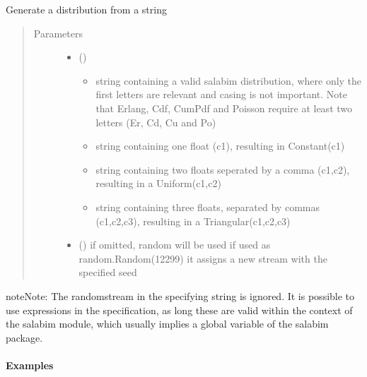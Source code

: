 \documentclass[letterpaper,10pt,english]{sphinxmanual}
\begin{document}
\begin{fulllineitems}
\label{\detokenize{Reference:salabim.Distribution}}
Generate a distribution from a string
\begin{quote}\begin{description}
\item[{Parameters}] \leavevmode\begin{itemize}
\item {} 
 () \textendash{} \begin{itemize}
\item {} 
string containing a valid salabim distribution, where only the first
letters are relevant and casing is not important. Note that Erlang,
Cdf, CumPdf and Poisson require at least two letters
(Er, Cd, Cu and Po)

\item {} 
string containing one float (c1), resulting in Constant(c1)

\item {} 
string containing two floats seperated by a comma (c1,c2),
resulting in a Uniform(c1,c2)

\item {} 
string containing three floats, separated by commas (c1,c2,c3),
resulting in a Triangular(c1,c2,c3)

\end{itemize}


\item {} 
 () \textendash{} if omitted, random will be used 
if used as random.Random(12299)
it assigns a new stream with the specified seed 

\end{itemize}

\end{description}\end{quote}

\begin{sphinxadmonition}{note}{Note:}
The randomstream in the specifying string is ignored. 
It is possible to use expressions in the specification, as long these
are valid within the context of the salabim module, which usually implies
a global variable of the salabim package.
\end{sphinxadmonition}
\paragraph{Examples}


\end{fulllineitems}
\end{document}
